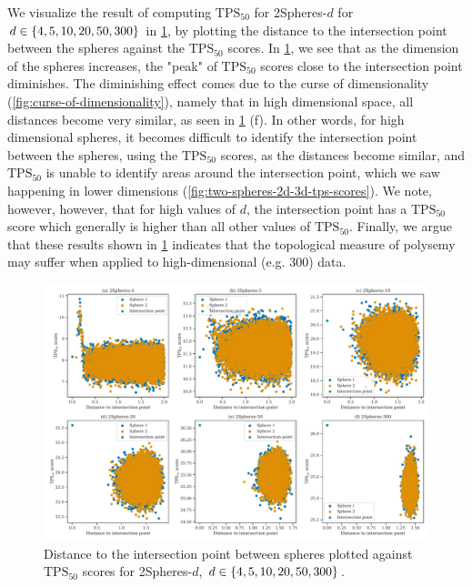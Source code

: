 We visualize the result of computing $\text{TPS}_{50}$ for 2Spheres-$d$ for $d \in \left\{4, 5, 10, 20, 50, 300\right\}$ in \cref{fig:two-spheres-distance-to-int-point-vs-tps-scores}, by plotting the distance to the intersection point between the spheres against the $\text{TPS}_{50}$ scores. In \cref{fig:two-spheres-distance-to-int-point-vs-tps-scores}, we see that as the dimension of the spheres increases, the "peak" of $\text{TPS}_{50}$ scores close to the intersection point diminishes. The diminishing effect comes due to the curse of dimensionality (\cref{fig:curse-of-dimensionality}), namely that in high dimensional space, all distances become very similar, as seen in \cref{fig:two-spheres-distance-to-int-point-vs-tps-scores} (f). In other words, for high dimensional spheres, it becomes difficult to identify the intersection point between the spheres, using the $\text{TPS}_{50}$ scores, as the distances become similar, and $\text{TPS}_{50}$ is unable to identify areas around the intersection point, which we saw happening in lower dimensions (\cref{fig:two-spheres-2d-3d-tps-scores}). We note, however, however, that for high values of $d$, the intersection point has a $\text{TPS}_{50}$ score which generally is higher than all other values of $\text{TPS}_{50}$. Finally, we argue that these results shown in \cref{fig:two-spheres-distance-to-int-point-vs-tps-scores} indicates that the topological measure of polysemy may suffer when applied to high-dimensional (e.g. 300) data.
\begin{figure}[H]
    \centering
    \includegraphics[width=\textwidth]{thesis/figures/two-spheres-distance-to-int-point-vs-tps-scores.pdf}
    \caption{Distance to the intersection point between spheres plotted against $\text{TPS}_{50}$ scores for 2Spheres-$d$, $d \in \left\{4, 5, 10, 20, 50, 300\right\}$.}
    \label{fig:two-spheres-distance-to-int-point-vs-tps-scores}
\end{figure}

